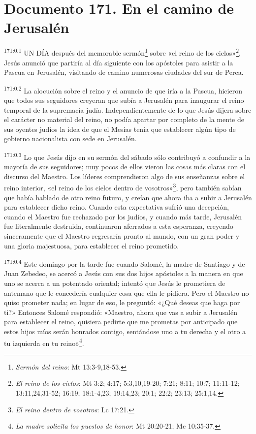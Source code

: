 \chapter{Documento 171. En el camino de Jerusalén}
\par
\textsuperscript{171:0.1} UN DÍA después del memorable sermón\footnote{\textit{Sermón del reino}: Mt 13:3-9,18-53.} sobre «el reino de los cielos»\footnote{\textit{El reino de los cielos}: Mt 3:2; 4:17; 5:3,10,19-20; 7:21; 8:11; 10:7; 11:11-12; 13:11,24,31-52; 16:19; 18:1-4,23; 19:14,23; 20:1; 22:2; 23:13; 25:1,14.}, Jesús anunció que partiría al día siguiente con los apóstoles para asistir a la Pascua en Jerusalén, visitando de camino numerosas ciudades del sur de Perea.

\par
\textsuperscript{171:0.2} La alocución sobre el reino y el anuncio de que iría a la Pascua, hicieron que todos sus seguidores creyeran que subía a Jerusalén para inaugurar el reino temporal de la supremacía judía. Independientemente de lo que Jesús dijera sobre el carácter no material del reino, no podía apartar por completo de la mente de sus oyentes judíos la idea de que el Mesías tenía que establecer algún tipo de gobierno nacionalista con sede en Jerusalén.

\par
\textsuperscript{171:0.3} Lo que Jesús dijo en su sermón del sábado sólo contribuyó a confundir a la mayoría de sus seguidores; muy pocos de ellos vieron las cosas más claras con el discurso del Maestro. Los líderes comprendieron algo de sus enseñanzas sobre el reino interior, «el reino de los cielos dentro de vosotros»\footnote{\textit{El reino dentro de vosotros}: Lc 17:21.}, pero también sabían que había hablado de otro reino futuro, y creían que ahora iba a subir a Jerusalén para establecer dicho reino. Cuando esta expectativa sufrió una decepción, cuando el Maestro fue rechazado por los judíos, y cuando más tarde, Jerusalén fue literalmente destruida, continuaron aferrados a esta esperanza, creyendo sinceramente que el Maestro regresaría pronto al mundo, con un gran poder y una gloria majestuosa, para establecer el reino prometido.

\par
\textsuperscript{171:0.4} Este domingo por la tarde fue cuando Salomé, la madre de Santiago y de Juan Zebedeo, se acercó a Jesús con sus dos hijos apóstoles a la manera en que uno se acerca a un potentado oriental; intentó que Jesús le prometiera de antemano que le concedería cualquier cosa que ella le pidiera. Pero el Maestro no quiso prometer nada; en lugar de eso, le preguntó: «¿Qué deseas que haga por ti?» Entonces Salomé respondió: «Maestro, ahora que vas a subir a Jerusalén para establecer el reino, quisiera pedirte que me prometas por anticipado que estos hijos míos serán honrados contigo, sentándose uno a tu derecha y el otro a tu izquierda en tu reino»\footnote{\textit{La madre solicita los puestos de honor}: Mt 20:20-21; Mc 10:35-37.}.

